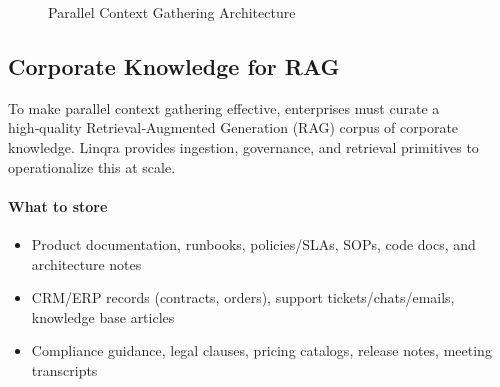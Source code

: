 \documentclass[11pt,a4paper]{article}
\begin{document}
\begin{figure}[H]
\centering
{}
\caption{Parallel Context Gathering Architecture}
\end{figure}

\subsection{Corporate Knowledge for RAG}

To make parallel context gathering effective, enterprises must curate a high‑quality Retrieval‑Augmented Generation (RAG) corpus of corporate knowledge. Linqra provides ingestion, governance, and retrieval primitives to operationalize this at scale.

\paragraph{What to store}
\begin{itemize}[leftmargin=*]
  \item Product documentation, runbooks, policies/SLAs, SOPs, code docs, and architecture notes
  \item CRM/ERP records (contracts, orders), support tickets/chats/emails, knowledge base articles
  \item Compliance guidance, legal clauses, pricing catalogs, release notes, meeting transcripts
\end{itemize}
\end{document}

